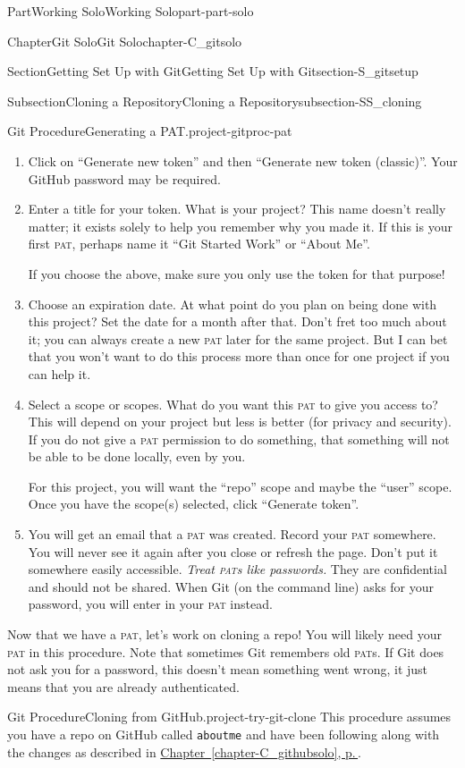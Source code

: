 \documentclass[twoside,10pt,]{book}
\newcommand{\xreffont}{\relax}
\newcommand{\mono}[1]{\texttt{#1}}
\newcommand{\acronym}[1]{\textsc{\MakeLowercase{#1}}}
\DeclareRobustCommand{\acronymintitle}[1]{\texorpdfstring{#1}{#1}}
\begin{document}
\begin{partptx}{Part}{Working Solo}{}{Working Solo}{}{}{part-part-solo}
\begin{chapterptx}{Chapter}{Git Solo}{}{Git Solo}{}{}{chapter-C_gitsolo}
\begin{sectionptx}{Section}{Getting Set Up with Git}{}{Getting Set Up with Git}{}{}{section-S_gitsetup}
\begin{subsectionptx}{Subsection}{Cloning a Repository}{}{Cloning a Repository}{}{}{subsection-SS_cloning}
\begin{project}{Git Procedure}{Generating a \acronymintitle{PAT}.}{project-gitproc-pat}
\begin{enumerate}[font=\bfseries,label=(\alph*),ref=\alph*]
\item{}Click on ``Generate new token'' and then ``Generate new token (classic)''. Your GitHub password may be required.%
\item{}Enter a title for your token. What is your project? This name doesn't really matter; it exists solely to help you remember why you made it. If this is your first \acronym{PAT}, perhaps name it ``Git Started Work'' or ``About Me''.%
\par
If you choose the above, make sure you only use the token for that purpose!%
\item{}Choose an expiration date. At what point do you plan on being done with this project? Set the date for a month after that. Don't fret too much about it; you can always create a new \acronym{PAT} later for the same project. But I can bet that you won't want to do this process more than once for one project if you can help it.%
\item{}Select a scope or scopes. What do you want this \acronym{PAT} to give you access to? This will depend on your project but less is better (for privacy and security). If you do not give a \acronym{PAT} permission to do something, that something will not be able to be done locally, even by you.%
\par
For this project, you will want the ``repo'' scope and maybe the ``user'' scope. Once you have the scope(s) selected, click ``Generate token''.%
\item{}You will get an email that a \acronym{PAT} was created. Record your \acronym{PAT} somewhere. You will never see it again after you close or refresh the page. Don't put it somewhere easily accessible. \emph{Treat \acronym{PAT}s like passwords.} They are confidential and should not be shared. When Git (on the command line) asks for your password, you will enter in your \acronym{PAT} instead.%
\end{enumerate}%
\end{project}%
Now that we have a \acronym{PAT}, let's work on cloning a repo! You will likely need your \acronym{PAT} in this procedure. Note that sometimes Git remembers old \acronym{PAT}s. If Git does not ask you for a password, this doesn't mean something went wrong, it just means that you are already authenticated.%
\begin{project}{Git Procedure}{Cloning from GitHub.}{project-try-git-clone}%
%
This procedure assumes you have a repo on GitHub called \mono{aboutme} and have been following along with the changes as described in \hyperref[chapter-C_githubsolo]{Chapter~{\xreffont\ref{chapter-C_githubsolo}}, p.\,\pageref{chapter-C_githubsolo}}.%

\end{project}
\end{subsectionptx}
\end{sectionptx}
\end{chapterptx}
\end{partptx}
\end{document}
